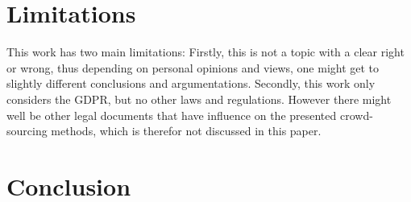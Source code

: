 \documentclass[a4paper,12pt]{report}
\begin{document}
	\chapter{Limitations}
	\startsection
		This work has two main limitations:
		Firstly, this is not a topic with a clear right or wrong, thus depending on personal opinions and views, one might get to slightly different conclusions and argumentations.
		Secondly, this work only considers the GDPR, but no other laws and regulations.
		However there might well be other legal documents that have influence on the presented crowd-sourcing methods, which is therefor not discussed in this paper.
	\closesection
	
	\chapter{Conclusion}
	
	\newpage
	\printbibliography
\end{document}

